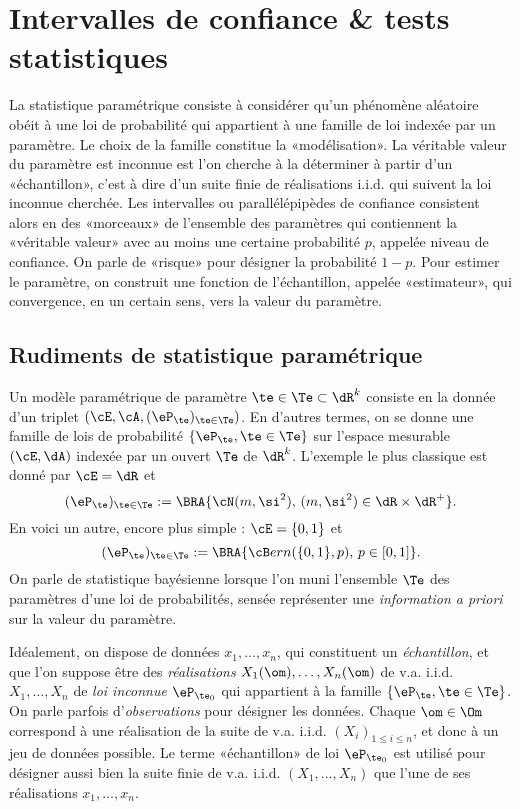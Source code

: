 \chapter{Intervalles de confiance \& tests statistiques}
\label{ch:ic+tests}
%
%


La statistique paramétrique consiste à considérer qu'un phénomène aléatoire
obéit à une loi de probabilité qui appartient à une famille de loi indexée par
un paramètre. Le choix de la famille constitue la «modélisation». La véritable
valeur du paramètre est inconnue est l'on cherche à la déterminer à partir
d'un «échantillon», c'est à dire d'un suite finie de réalisations i.i.d. qui
suivent la loi inconnue cherchée. Les intervalles ou parallélépipèdes de
confiance consistent alors en des «morceaux» de l'ensemble des paramètres qui
contiennent la «véritable valeur» avec au moins une certaine probabilité $p$,
appelée niveau de confiance.  On parle de «risque» pour désigner la
probabilité $1-p$. Pour estimer le paramètre, on construit une fonction de
l'échantillon, appelée «estimateur», qui convergence, en un certain sens, vers
la valeur du paramètre.

%
\section{Rudiments de statistique paramétrique}
%

Un modèle paramétrique de paramètre $\te\in\Te\subset\dR^k$ consiste en la donnée d'un
triplet $(\cE,\cA,(\eP_\te)_{\te\in\Te})$. En d'autres termes, on se donne une
famille de lois de probabilité $\{\eP_\te,\te\in\Te\}$ sur l'espace mesurable
$(\cE,\dA)$ indexée par un ouvert $\Te$ de $\dR^k$. L'exemple le plus
classique est donné par $\cE=\dR$ et
$$
(\eP_\te)_{\te\in\Te}:=\BRA{\cN(m,\si^2),\,(m,\si^2)\in\dR\times\dR^+}.
$$
En voici un autre, encore plus simple : $\cE=\{0,1\}$ et
$$
(\eP_\te)_{\te\in\Te}:=\BRA{{\cB}ern(\{0,1\},p),\,p\in[0,1]}.
$$
On parle de statistique bayésienne lorsque l'on muni l'ensemble $\Te$ des
paramètres d'une loi de probabilités, sensée représenter une \emph{information
  a priori} sur la valeur du paramètre.

Idéalement, on dispose de données $x_1,\ldots,x_n$, qui constituent un
\emph{échantillon}, et que l'on suppose être des \emph{réalisations}
$X_1(\om),\ldots,X_n(\om)$ de v.a. i.i.d. $X_1,\ldots,X_n$ de \emph{loi inconnue}
$\eP_{\te_0}$ qui appartient à la famille $\{\eP_\te,\te\in\Te\}$. On parle
parfois d'\emph{observations} pour désigner les données. Chaque $\om\in\Om$
correspond à une réalisation de la suite de v.a. i.i.d. $(X_i)_{1\leq i\leq n}$, et
donc à un jeu de données possible. Le terme «échantillon» de loi $\eP_{\te_0}$
est utilisé pour désigner aussi bien la suite finie de v.a. i.i.d.
$(X_1,\ldots,X_n)$ que l'une de ses réalisations $x_1,\ldots,x_n$.

